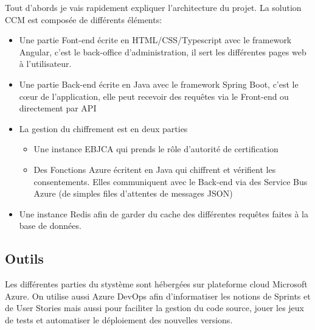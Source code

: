 \documentclass[12pt, a4paper]{report}
\begin{document}
        Tout d'abords je vais rapidement expliquer l'architecture du projet.
        La solution CCM est composée de différents éléments:
        \begin{itemize}
            \item Une partie Font-end écrite en HTML/CSS/Typescript avec le framework Angular, c'est le back-office d'administration, il sert les différentes pages web à l'utilisateur.
            \item Une partie Back-end écrite en Java avec le framework Spring Boot, c'est le cœur de l'application, elle peut recevoir des requêtes via le Front-end ou directement par API
            \item La gestion du chiffrement est en deux parties
                \begin{itemize}
                    \item Une instance EBJCA qui prends le rôle d'autorité de certification
                    \item Des Fonctions Azure écritent en Java qui chiffrent et vérifient les consentements. Elles communiquent avec le Back-end via des Service Bus Azure (de simples files d'attentes de messages JSON)
                \end{itemize}
            \item Une instance Redis afin de garder du cache des différentes requêtes faites à la base de données.
        \end{itemize}
        \subsection{Outils}
            Les différentes parties du stystème sont hébergées sur plateforme cloud Microsoft Azure.\newline
            On utilise aussi Azure DevOps afin d'informatiser les notions de Sprints et de User Stories mais aussi pour faciliter la gestion du code source, jouer les jeux de tests et automatiser le déploiement des nouvelles versions.
\end{document}
